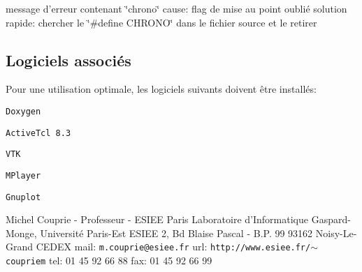 message d'erreur contenant \char`\"{}chrono\char`\"{} cause: flag de mise au point oubli\'{e} solution rapide: chercher le \char`\"{}\#define CHRONO\char`\"{} dans le fichier source et le retirer\subsection{Logiciels associ\'{e}s}\label{associes}
Pour une utilisation optimale, les logiciels suivants doivent \^{e}tre install\'{e}s:\par
\par
 {\tt Doxygen}\par
 {\tt Active\-Tcl 8.3}\par
 {\tt VTK}\par
 {\tt MPlayer}\par
 {\tt Gnuplot}\par




 Michel Couprie - Professeur - ESIEE Paris Laboratoire d'Informatique Gaspard-Monge, Universit\'{e} Paris-Est ESIEE 2, Bd Blaise Pascal - B.P. 99 93162 Noisy-Le-Grand CEDEX mail: {\tt m.couprie@esiee.fr} url: {\tt http://www.esiee.fr/$\sim$coupriem} tel: 01 45 92 66 88 fax: 01 45 92 66 99 